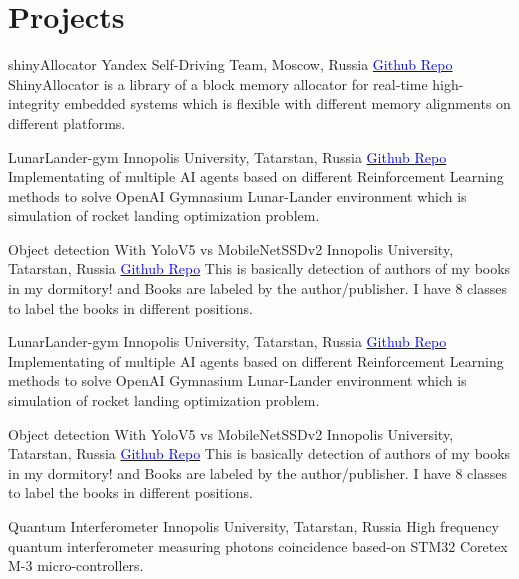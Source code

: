 \section{Projects}

    {shinyAllocator}
    {Yandex Self-Driving Team, Moscow, Russia}{}{}
    {\href{https://github.com/Ehsan2754/ShinyAllocator}{\textcolor{blue}{Github Repo}}  
    ShinyAllocator is a library of a block memory allocator for real-time high-integrity embedded systems which is flexible with different memory alignments on different platforms.  }
    

    {LunarLander-gym}
    {Innopolis University, Tatarstan, Russia}{}{}
    {\href{https://github.com/Ehsan2754/lunarlander_gym}{\textcolor{blue}{Github Repo}}  
    Implementating of multiple AI agents based on different Reinforcement Learning methods to solve OpenAI Gymnasium Lunar-Lander environment which is simulation of rocket landing optimization problem.  }
    
    {Object detection With YoloV5 vs MobileNetSSDv2}
    {Innopolis University, Tatarstan, Russia}{}{}
    {\href{https://github.com/Ehsan2754/ObjectDetection}{\textcolor{blue}{Github Repo}}  
   This is basically detection of authors of my books in my dormitory! and Books are labeled by the author/publisher. I have 8 classes to label the books in different positions.}
    

    {LunarLander-gym}
    {Innopolis University, Tatarstan, Russia}{}{}
    {\href{https://github.com/Ehsan2754/lunarlander_gym}{\textcolor{blue}{Github Repo}}  
    Implementating of multiple AI agents based on different Reinforcement Learning methods to solve OpenAI Gymnasium Lunar-Lander environment which is simulation of rocket landing optimization problem.  }
    
    {Object detection With YoloV5 vs MobileNetSSDv2}
    {Innopolis University, Tatarstan, Russia}{}{}
    {\href{https://github.com/Ehsan2754/ObjectDetection}{\textcolor{blue}{Github Repo}}  
   This is basically detection of authors of my books in my dormitory! and Books are labeled by the author/publisher. I have 8 classes to label the books in different positions.}
    

    {Quantum Interferometer}
    {Innopolis University, Tatarstan, Russia}{}{}
    {High frequency quantum interferometer measuring photons coincidence based-on STM32 Coretex M-3 micro-controllers.}
    
